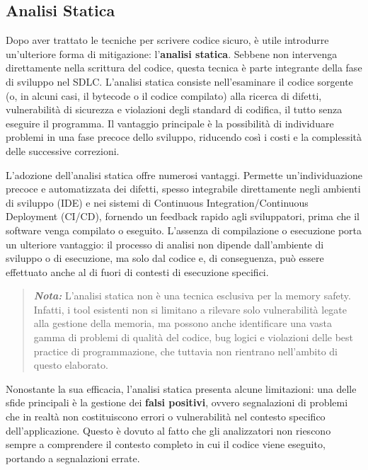 \subsection{Analisi Statica}
\label{sec:analisi-statica}

Dopo aver trattato le tecniche per scrivere codice sicuro, è utile introdurre un'ulteriore
forma di mitigazione: l'\textbf{analisi statica}. Sebbene non intervenga
direttamente nella scrittura del codice, questa tecnica è parte integrante della
fase di sviluppo nel SDLC. L'analisi statica consiste nell'esaminare il codice
sorgente (o, in alcuni casi, il bytecode o il codice compilato) alla ricerca di
difetti, vulnerabilità di sicurezza e violazioni degli standard di codifica, il
tutto senza eseguire il programma. Il vantaggio principale è la possibilità di individuare
problemi in una fase precoce dello sviluppo, riducendo così i costi e la
complessità delle successive correzioni.

L'adozione dell'analisi statica offre numerosi vantaggi. Permette un'individuazione
precoce e automatizzata dei difetti, spesso integrabile direttamente negli
ambienti di sviluppo (IDE) e nei sistemi di Continuous Integration/Continuous
Deployment (CI/CD), fornendo un feedback rapido agli sviluppatori, prima che il
software venga compilato o eseguito. L'assenza di compilazione o esecuzione porta
un ulteriore vantaggio: il processo di analisi non dipende dall'ambiente di
sviluppo o di esecuzione, ma solo dal codice e, di conseguenza, può essere effettuato
anche al di fuori di contesti di esecuzione specifici.

\begin{quote}
  \textbf{\textit{Nota:}} L'analisi statica non è una tecnica esclusiva per la
  memory safety. Infatti, i tool esistenti non si limitano a rilevare solo
  vulnerabilità legate alla gestione della memoria, ma possono anche identificare
  una vasta gamma di problemi di qualità del codice, bug logici e violazioni
  delle best practice di programmazione, che tuttavia non rientrano nell'ambito di
  questo elaborato.
\end{quote}

\noindent
Nonostante la sua efficacia, l'analisi statica presenta alcune limitazioni: una
delle sfide principali è la gestione dei \textbf{falsi positivi}, ovvero
segnalazioni di problemi che in realtà non costituiscono errori o vulnerabilità
nel contesto specifico dell'applicazione. Questo è dovuto al fatto che gli analizzatori
non riescono sempre a comprendere il contesto completo in cui il codice viene eseguito,
portando a segnalazioni errate.

